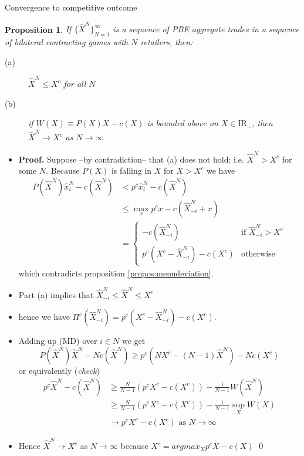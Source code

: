 \documentclass[11pt,english]{beamer}
\newcommand{\re}{\mbox{I}\!\mbox{R}}
\newtheorem{proposition}{Proposition}
\begin{document}
\begin{frame}[allowframebreaks]{Convergence to competitive outcome}
  \begin{proposition}
    If $\{\hat{X}^N \}_{N=1}^{\infty}$ is a sequence of PBE aggregate
    trades in a sequence of bilateral contracting games with $N$
    retailers, then:
    \begin{description}
    \item[(a)] $\hat{X}^N \leq X^c$ for all $N$
    \item[(b)] if $W(X) \equiv P(X)X-c(X)$ is bounded above on $X \in
      \re_+$, then $\hat{X}^N \rightarrow X^c$ as $N \rightarrow \infty$
    \end{description}
  \end{proposition}
  \begin{itemize}
  \item \textbf{Proof.} Suppose --by contradiction-- that (a) does not
    hold; i.e. $\hat{X}^N > X^c$ for some $N$. Because $P(X)$ is
    falling in $X$ for $X>X^c$ we have
    \begin{align}
      P(\hat{X}^N)\hat{x}_i^N - c(\hat{X}^N) & < p^c \hat{x}^N_i - c(\hat{X}^N) \\
      & \leq \max_x p^c x - c(\hat{X}^N_{-i} +x) \\
      & =
      \begin{cases}
        -c(\hat{X}^N_{-i}) & \text{if } \hat{X}^N_{-i} > X^c \\
        p^c(X^c - \hat{X}^N_{-i})-c(X^c) & \text{otherwise}
      \end{cases}
    \end{align}
    which contradicts proposition \ref{propos:menudeviation}.
  \item Part (a) implies that $\hat{X}^N_{-i} \leq \hat{X}^N \leq X^c$
  \item hence we have $\Pi^c(\hat{X}^N_{-i}) = p^c (X^c -
    \hat{X}^N_{-i}) - c(X^c)$.
  \item Adding up (MD) over $i \in N$ we get
    \begin{equation*}
      P(\hat{X}^N)\hat{X}^N-Nc(\hat{X}^N) \geq p^c(NX^c - (N-1)\hat{X}^N)-Nc(X^c)
    \end{equation*}
    or equivalently (\emph{check})
    \begin{align}
      p^c \hat{X}^N-c(\hat{X}^N) & \geq \frac{N}{N-1} (p^c X^c -
      c(X^c)) -\frac{1}{N-1} W(\hat{X}^N) \\
      & \geq \frac{N}{N-1} (p^c X^c -
      c(X^c)) -\frac{1}{N-1} \sup_X W(X) \\
      & \rightarrow p^cX^c - c(X^c) \text{ as } N \rightarrow \infty
    \end{align}
  \item Hence $\hat{X}^N \rightarrow X^c$ as $N\rightarrow \infty$
    because $X^c = argmax_X p^c X -c(X)$ \qed
  \end{itemize}
\end{frame}
\end{document}
